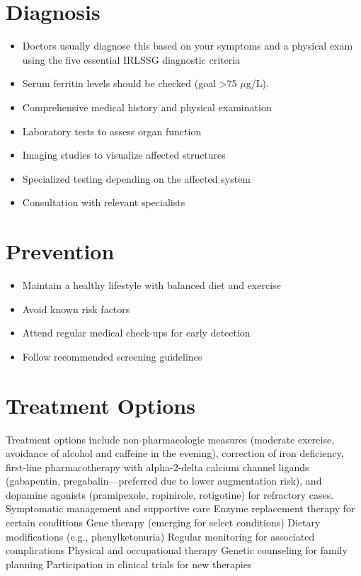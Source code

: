 \section{Diagnosis}
\begin{itemize}[noitemsep]
  \item Doctors usually diagnose this based on your symptoms and a physical exam using the five essential IRLSSG diagnostic criteria
  \item Serum ferritin levels should be checked (goal >75 $\mu$g/L).
  \item Comprehensive medical history and physical examination
  \item Laboratory tests to assess organ function
  \item Imaging studies to visualize affected structures
  \item Specialized testing depending on the affected system
  \item Consultation with relevant specialists
\end{itemize}
\section{Prevention}
\begin{itemize}[noitemsep]
  \item Maintain a healthy lifestyle with balanced diet and exercise
  \item Avoid known risk factors
  \item Attend regular medical check-ups for early detection
  \item Follow recommended screening guidelines
\end{itemize}
\section{Treatment Options}
Treatment options include non-pharmacologic measures (moderate exercise, avoidance of alcohol and caffeine in the evening), correction of iron deficiency, first-line pharmacotherapy with alpha-2-delta calcium channel ligands (gabapentin, pregabalin---preferred due to lower augmentation risk), and dopamine agonists (pramipexole, ropinirole, rotigotine) for refractory cases. Symptomatic management and supportive care Enzyme replacement therapy for certain conditions Gene therapy (emerging for select conditions) Dietary modifications (e.g., phenylketonuria) Regular monitoring for associated complications Physical and occupational therapy Genetic counseling for family planning Participation in clinical trials for new therapies

